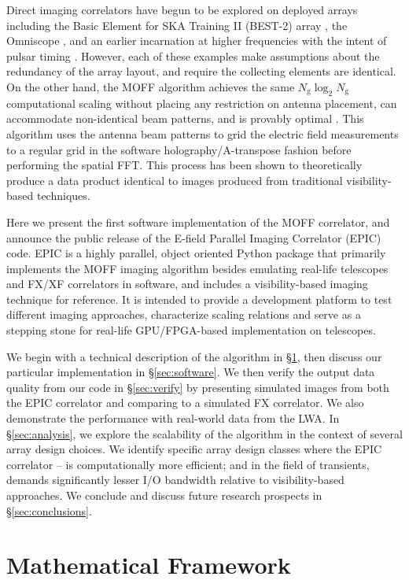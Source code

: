 \documentclass[a4paper,fleqn,usenatbib]{mnras}
\newcommand{\Ngrid}{N_\textrm{g}}
\begin{document}
Direct imaging correlators have begun to be explored on deployed arrays including
the Basic Element for SKA Training II (BEST-2) array \citep{fos14}, the Omniscope
\citep{zhe14}, and an earlier incarnation at higher frequencies with the intent
of pulsar timing \citep{oto94, dai00}. However, each of these examples make
assumptions about the redundancy of the array layout, and require the collecting
elements are identical. On the other hand, the MOFF algorithm achieves the same
$\Ngrid \log_2 \Ngrid$ computational scaling without placing any restriction on
antenna placement, can accommodate non-identical beam patterns, and is provably 
optimal \citep{mor11}. This algorithm uses the antenna beam patterns to 
grid the electric field measurements to a regular grid in the software 
holography/A-transpose fashion \citep{mor09,bha08,teg97b} before performing the
spatial FFT. This process has been shown to theoretically produce a data product
identical to images produced from traditional visibility-based techniques.

Here we present the first software implementation of the MOFF correlator, and
announce the public release of the E-field Parallel Imaging Correlator (EPIC)
code. EPIC is a highly parallel, object oriented Python package that primarily 
implements the MOFF imaging algorithm besides emulating real-life telescopes and 
FX/XF correlators in software, and includes a visibility-based imaging technique 
for reference. It is intended to provide a development platform to test different 
imaging approaches, characterize scaling relations and serve as a stepping stone 
for real-life GPU/FPGA-based implementation on telescopes.

We begin with a technical description of the algorithm in \S\ref{sec:math}, 
then discuss our particular implementation in \S\ref{sec:software}. We then 
verify the output data quality from our code in \S\ref{sec:verify} by presenting 
simulated images from both the EPIC correlator and comparing to a simulated FX 
correlator. We also demonstrate the performance with real-world data from the 
LWA. In \S \ref{sec:analysis}, we explore the scalability of the algorithm in the 
context of several array design choices. We identify specific array design 
classes where the EPIC correlator -- is computationally more efficient; and in 
the field of transients, demands significantly lesser I/O bandwidth relative to 
visibility-based approaches. We conclude and discuss future research prospects 
in \S\ref{sec:conclusions}.

\section{Mathematical Framework}\label{sec:math}
\end{document}
